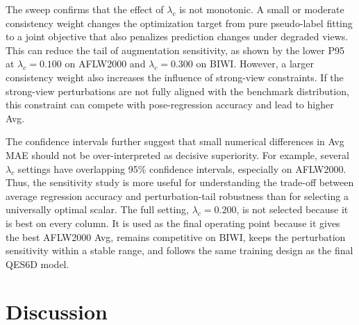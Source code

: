 \documentclass[preprint,12pt]{elsarticle}
\begin{document}
The sweep confirms that the effect of $\lambda_c$ is not monotonic. A small or moderate consistency weight changes the optimization target from pure pseudo-label fitting to a joint objective that also penalizes prediction changes under degraded views. This can reduce the tail of augmentation sensitivity, as shown by the lower P95 at $\lambda_c=0.100$ on AFLW2000 and $\lambda_c=0.300$ on BIWI. However, a larger consistency weight also increases the influence of strong-view constraints. If the strong-view perturbations are not fully aligned with the benchmark distribution, this constraint can compete with pose-regression accuracy and lead to higher Avg.

The confidence intervals further suggest that small numerical differences in Avg MAE should not be over-interpreted as decisive superiority. For example, several $\lambda_c$ settings have overlapping 95\% confidence intervals, especially on AFLW2000. Thus, the sensitivity study is more useful for understanding the trade-off between average regression accuracy and perturbation-tail robustness than for selecting a universally optimal scalar. The full setting, $\lambda_c=0.200$, is not selected because it is best on every column. It is used as the final operating point because it gives the best AFLW2000 Avg, remains competitive on BIWI, keeps the perturbation sensitivity within a stable range, and follows the same training design as the final QES6D model.


\section{Discussion}
\end{document}
